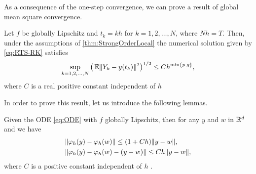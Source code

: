 \documentclass[10pt]{article}
\begin{document}
As a consequence of the one-step convergence, we can prove a result of global mean square convergence.
\begin{theorem}\label{thm:StrongOrder} Let $f$ be globally Lipschitz and $t_k = kh$ for $k = 1, 2, \ldots, N$, where $Nh = T$. Then, under the assumptions of \cref{thm:StrongOrderLocal} the numerical solution given by \eqref{eq:RTS-RK} satisfies 
	\begin{equation}\label{eq:StrongGlobal}
		\sup_{k=1,2, \ldots, N} \big(\operatorname{\mathbb{E}}\lVert Y_k - y(t_k)\rVert^2\big)^{1/2} \leq C h^{\min\{p, q\}},
	\end{equation}
	where $C$ is a real positive constant independent of $h$ 
\end{theorem}
In order to prove this result, let us introduce the following lemmas.
\begin{lemma}\label{lem:ODERepresentation} Given the ODE \eqref{eq:ODE} with $f$ globally Lipschitz, then for any $y$ and $w$ in $\mathbb{R}^d$ and  we have
	\begin{align}
		&\lVert\varphi_h(y) - \varphi_h(w)\rVert \leq (1 + Ch) \lVert y - w\rVert,\label{eq:FlowLipschitz}\\
		&\lVert\varphi_h(y) - \varphi_h(w) - (y - w)\rVert \leq Ch\lVert y - w\rVert,\label{eq:FlowLipschitzBoundRem}
	\end{align}
	where $C$ is a positive constant independent of $h$ .
\end{lemma}
\end{document}
